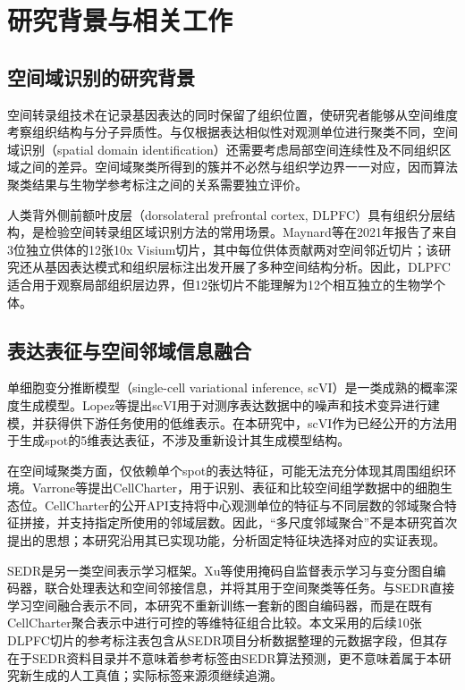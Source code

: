 \documentclass[UTF8,a4paper,12pt]{ctexart}
\begin{document}
\section{研究背景与相关工作}
\label{sec:background}

\subsection{空间域识别的研究背景}
空间转录组技术在记录基因表达的同时保留了组织位置，使研究者能够从空间维度考察组织结构与分子异质性。与仅根据表达相似性对观测单位进行聚类不同，空间域识别（spatial domain identification）还需要考虑局部空间连续性及不同组织区域之间的差异。空间域聚类所得到的簇并不必然与组织学边界一一对应，因而算法聚类结果与生物学参考标注之间的关系需要独立评价。

人类背外侧前额叶皮层（dorsolateral prefrontal cortex, DLPFC）具有组织分层结构，是检验空间转录组区域识别方法的常用场景。Maynard等在2021年报告了来自3位独立供体的12张10x Visium切片，其中每位供体贡献两对空间邻近切片；该研究还从基因表达模式和组织层标注出发开展了多种空间结构分析\cite{maynard2021}。因此，DLPFC适合用于观察局部组织层边界，但12张切片不能理解为12个相互独立的生物学个体。

\subsection{表达表征与空间邻域信息融合}
单细胞变分推断模型（single-cell variational inference, scVI）是一类成熟的概率深度生成模型。Lopez等提出scVI用于对测序表达数据中的噪声和技术变异进行建模，并获得供下游任务使用的低维表示\cite{lopez2018}。在本研究中，scVI作为已经公开的方法用于生成spot的5维表达表征，不涉及重新设计其生成模型结构。

在空间域聚类方面，仅依赖单个spot的表达特征，可能无法充分体现其周围组织环境。Varrone等提出CellCharter，用于识别、表征和比较空间组学数据中的细胞生态位\cite{varrone2024}。CellCharter的公开API支持将中心观测单位的特征与不同层数的邻域聚合特征拼接，并支持指定所使用的邻域层数。因此，“多尺度邻域聚合”不是本研究首次提出的思想；本研究沿用其已实现功能，分析固定特征块选择对应的实证表现。

SEDR是另一类空间表示学习框架。Xu等使用掩码自监督表示学习与变分图自编码器，联合处理表达和空间邻接信息，并将其用于空间聚类等任务\cite{xu2024}。与SEDR直接学习空间融合表示不同，本研究不重新训练一套新的图自编码器，而是在既有CellCharter聚合表示中进行可控的等维特征组合比较。本文采用的后续10张DLPFC切片的参考标注表包含从SEDR项目分析数据整理的元数据字段，但其存在于SEDR资料目录并不意味着参考标签由SEDR算法预测，更不意味着属于本研究新生成的人工真值；实际标签来源须继续追溯。
\end{document}
